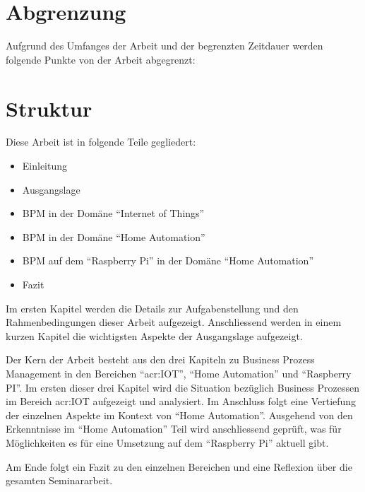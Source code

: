 \section{Abgrenzung} \label{sec:Abgrenzung}
Aufgrund des Umfanges der Arbeit und der begrenzten Zeitdauer werden folgende Punkte von der Arbeit abgegrenzt:

\begin{itemize}
\end{itemize}


\section{Struktur}
Diese Arbeit ist in folgende Teile gegliedert:

\begin{itemize}
\item Einleitung
\item Ausgangslage
\item BPM in der Domäne "`Internet of Things"'
\item BPM in der Domäne "`Home Automation"'
\item BPM auf dem "`Raspberry Pi"' in der Domäne "`Home Automation"'
\item Fazit
\end{itemize}

Im ersten Kapitel werden die Details zur Aufgabenstellung und den Rahmenbedingungen dieser Arbeit aufgezeigt. Anschliessend werden in einem kurzen Kapitel die wichtigsten Aspekte der Ausgangslage aufgezeigt.

Der Kern der Arbeit besteht aus den drei Kapiteln zu Business Prozess Management in den Bereichen "`\gls{acr:IOT}"', "`Home Automation"' und "`Raspberry PI"'. Im ersten dieser drei Kapitel wird die Situation bezüglich Business Prozessen im Bereich \gls{acr:IOT} aufgezeigt und analysiert. Im Anschluss folgt eine Vertiefung der einzelnen Aspekte im Kontext von "`Home Automation"'. Ausgehend von den Erkenntnisse im "`Home Automation"' Teil wird anschliessend geprüft, was für Möglichkeiten es für eine Umsetzung auf dem "`Raspberry Pi"' aktuell gibt.

Am Ende folgt ein Fazit zu den einzelnen Bereichen und eine Reflexion über die gesamten Seminararbeit.
